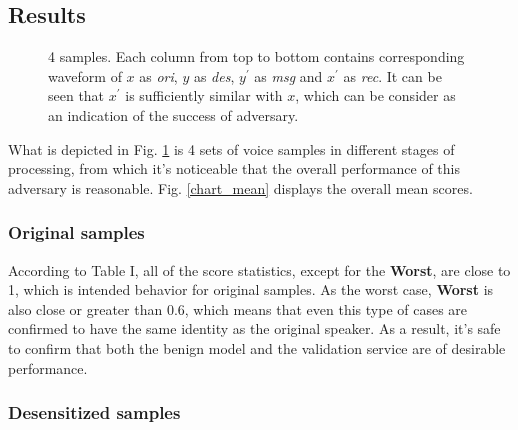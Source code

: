 \documentclass[journal]{IEEEtran} %
\begin{document}
\subsection{Results}

\begin{figure}[tb]
    \caption{4 samples. Each column from top to bottom contains corresponding waveform of $x$ as \textit{ori}, $y$ as \textit{des}, $y^{\prime}$ as \textit{msg} and $x^{\prime}$ as \textit{rec}. It can be seen that $x^{\prime}$ is sufficiently similar with $x$, which can be consider as an indication of the success of adversary.}
    \label{samp1}
\end{figure}

What is depicted in Fig. \ref{samp1} is 4 sets of voice samples in different stages of processing, from which it's noticeable that the overall performance of this adversary is reasonable. Fig. \ref{chart_mean} displays the overall mean scores.

\subsubsection{Original samples}

According to Table I, all of the score statistics, except for the \textbf{Worst}, are close to 1, which is intended behavior for original samples. As the worst case, \textbf{Worst} is also close or greater than 0.6, which means that even this type of cases are confirmed to have the same identity as the original speaker. As a result, it's safe to confirm that both the benign model and the validation service are of desirable performance.

\subsubsection{Desensitized samples}
\end{document}

